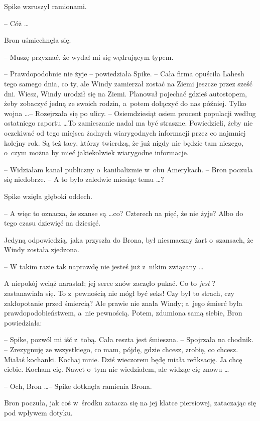 \documentclass[oneside,polish,11pt,rmheadings]{mwbk}
\begin{document}
Spike wzruszył ramionami. 

-- Cóż \ldots  

Bron uśmiechnęła się. 

-- Muszę przyznać, że wydał mi się wędrującym typem. 

-- Prawdopodobnie nie żyje -- powiedziała Spike. -- Cała firma opuściła Lahesh tego samego dnia, co ty, ale Windy zamierzał zostać na Ziemi jeszcze przez sześć dni. Wiesz, Windy urodził się na Ziemi. Planował pojechać gdzieś autostopem, żeby zobaczyć jedną ze swoich rodzin, a~potem dołączyć do nas później. Tylko wojna \ldots  -- Rozejrzała się po ulicy. -- Osiemdziesiąt osiem procent populacji według ostatniego raportu \ldots  To zamieszanie nadal ma być straszne. Powiedzieli, żeby nie oczekiwać od tego miejsca żadnych wiarygodnych informacji przez co najmniej kolejny rok. Są też tacy, którzy twierdzą, że już nigdy nie będzie tam niczego, o~czym można by mieć jakiekolwiek wiarygodne informacje. 

-- Widziałam kanał publiczny o~kanibalizmie w~obu Amerykach. --  Bron poczuła się niedobrze. -- A to było zaledwie miesiąc temu \ldots ? 

Spike wzięła głęboki oddech. 

-- A więc to oznacza, że szanse są \ldots  co? Czterech na pięć, że nie żyje? Albo do tego czasu dziewięć na dziesięć. 

Jedyną odpowiedzią, jaka przyszła do Brona, był niesmaczny żart o~szansach, że Windy została zjedzona. 

-- W takim razie tak naprawdę nie jesteś już z~nikim związany \ldots  

A niepokój wciąż narastał; jej serce znów zaczęło pukać. Co to \textit{jest }? zastanawiała się. To z~pewnością nie mógł być seks! Czy był to strach, czy zakłopotanie przed śmiercią? Ale prawie nie znała Windy; a~jego śmierć była prawdopodobieństwem, a~nie pewnością. Potem, zdumiona samą siebie, Bron powiedziała: 

-- Spike, pozwól mi iść z~tobą. Cała reszta jest śmieszna. --  Spojrzała na chodnik. -- Zrezygnuję ze wszystkiego, co mam, pójdę, gdzie chcesz, zrobię, co chcesz. Miałaś kochanki. Kochaj mnie. Dziś wieczorem będę miała refiksację. Ja chcę ciebie. Kocham cię. Nawet o~tym nie wiedziałem, ale widząc cię znowu \ldots  

-- Och, Bron  \ldots  -- Spike dotknęła ramienia Brona. 

Bron poczuła, jak coś w~środku zatacza się na jej klatce piersiowej, zataczając się pod wpływem dotyku. 
\end{document}
